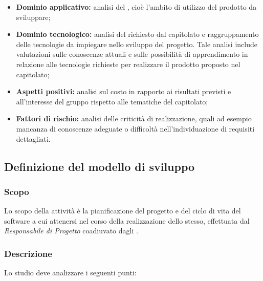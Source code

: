 \documentclass[../NormediProgetto.tex]{subfiles}
\begin{document}
\begin{itemize}
	\item \textbf{Dominio applicativo:} analisi del , cioè l'ambito di utilizzo del prodotto da sviluppare;
	
	\item \textbf{Dominio tecnologico:} analisi del  richiesto dal capitolato e raggruppamento delle tecnologie da impiegare nello sviluppo del progetto. Tale analisi include valutazioni sulle conoscenze attuali e sulle possibilità di apprendimento in relazione alle tecnologie richieste per realizzare il prodotto proposto nel capitolato;
	
	\item \textbf{Aspetti positivi:} analisi sul costo in rapporto ai risultati previsti e all’interesse del gruppo rispetto alle tematiche del capitolato;
	
	\item \textbf{Fattori di rischio:} analisi delle criticità di realizzazione, quali ad esempio mancanza di conoscenze adeguate o difficoltà nell’individuazione di requisiti dettagliati.

\end{itemize}


\subsection{Definizione del modello di sviluppo}

\subsubsection{Scopo}

Lo scopo della attività è la pianificazione del progetto e del ciclo di vita del software a cui attenersi nel corso della realizzazione dello stesso, effettuata dal \textit{Responsabile di Progetto} coadiuvato dagli . 

\subsubsection{Descrizione}

Lo studio deve analizzare i seguenti punti:
\end{document}
